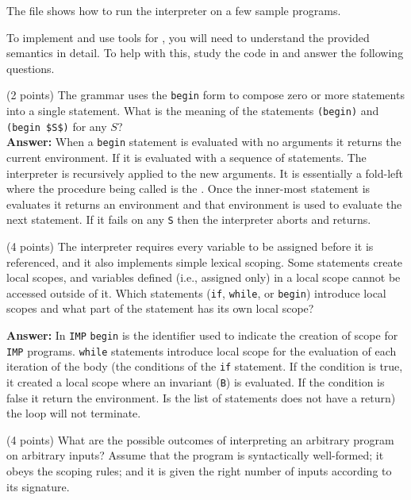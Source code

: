 \documentclass{handout}
\begin{document}
The file  shows how to run the \imp interpreter on a few
sample programs.

To implement and use tools for \imp, you will need to understand the provided
semantics in detail. To help with this, study the code in 
and answer the following questions.

\begin{questions}
  \item (2 points) \label{prob:imp-first} The \imp grammar uses the
  \lstinline{begin} form to compose zero or more \imp statements into a single
  statement. What is the meaning of the statements \lstinline{(begin)} and
  \lstinline{(begin $S$)} for any $S$?\\
  
  \textbf{Answer:} When a \lstinline{begin} statement is evaluated with no arguments it returns the current environment. If it is evaluated with a sequence of statements. The interpreter is recursively applied to the new arguments. It is essentially a fold-left where the procedure being called is the . Once the inner-most statement is evaluates it returns an environment and that environment is used to evaluate the next statement. If it fails on any \lstinline{S} then the interpreter aborts and returns.   

  \item (4 points) The \imp interpreter requires every variable to be assigned
  before it is referenced, and it also implements simple lexical scoping. Some
  \imp statements create local scopes, and variables defined (i.e., assigned
  only) in a local scope cannot be accessed outside of it. Which \imp statements
  (\lstinline{if}, \lstinline{while}, or \lstinline{begin}) introduce local
  scopes and what part of the statement has its own local scope?

  \textbf{Answer:} In \lstinline{IMP} \lstinline{begin} is the identifier used to indicate the creation of scope for \lstinline{IMP} programs. \lstinline{while} statements  introduce local scope for the evaluation of each iteration of the body (the conditions of the \lstinline{if} statement.  If the condition is true, it created a local scope where an invariant (\lstinline{B}) is evaluated. If the condition is false it return the environment. Is the list of statements does not have a return) the loop will not terminate. 

  \item (4 points) \label{prob:imp-last}  What are the possible outcomes of
  interpreting an arbitrary \imp program on arbitrary inputs? Assume that the
  program is syntactically well-formed; it obeys the \imp scoping rules; and it
  is given the right number of inputs according to its signature.\\


\end{questions}
\end{document}
